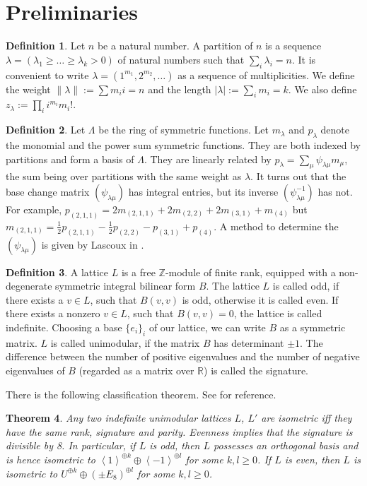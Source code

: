 \documentclass{amsart}
\newcommand{\coloneqq}{:=}
\newcommand{\IR}{\mathbb{R}}
\newcommand{\IZ}{\mathbb{Z}}
\theoremstyle{plain}
\newtheorem{theorem}{Theorem}[section]
\theoremstyle{definition}
\newtheorem{definition}[theorem]{Definition}
\theoremstyle{remark}
\begin{document}
\section{Preliminaries}
\begin{definition}
Let $n$ be a natural number. A partition of $n$ is a sequence $\lambda = (\lambda_1\geq\ldots\geq\lambda_k>0)$ of natural numbers such that $\sum_i \lambda_i =n$. It is convenient to write $\lambda = (1^{m_1},2^{m_2},\ldots)$ as a sequence of multiplicities. We define the weight $\|\lambda\| :=\sum m_i i =n$ and the length $|\lambda| := \sum_i m_i =k$. We also define $z_\lambda \coloneqq\prod_i i^{m_i} m_i!$. 
\end{definition}
\begin{definition} \label{SymFun}
Let $\Lambda$ be the ring of symmetric functions. Let $m_\lambda$ and $p_\lambda$ denote the monomial and the power sum symmetric functions. They are both indexed by partitions and form a basis of $\Lambda$. They are linearly related by $p_\lambda = \sum_{\mu} \psi_{\lambda\mu}m_\mu$, the sum being over partitions with the same weight as $\lambda$. It turns out that the base change matrix $(\psi_{\lambda\mu})$ has integral entries, but its inverse $(\psi_{\lambda\mu}^{-1})$ has not. For example, $p_{(2,1,1)} = 2m_{(2,1,1)} + 2m_{(2,2)}+2m_{(3,1)}+m_{(4)} $ but $ m_{(2,1,1)} = \frac{1}{2}p_{(2,1,1)} -\frac{1}{2}p_{(2,2)} -p_{(3,1)}+p_{(4)}$. A method to determine the $(\psi_{\lambda\mu})$ is given by Lascoux in \cite[Sect. 3.7]{Lascoux}.
\end{definition}
\begin{definition}
A lattice $L$ is a free $\IZ$-module of finite rank, equipped with a non-degenerate symmetric integral bilinear form $B$. The lattice $L$ is called odd, if there exists a $v\in L$, such that $B(v,v)$ is odd, otherwise it is called even. 
If there exists a nonzero $v \in L$, such that $B(v,v)= 0$, the lattice is called indefinite. 
Choosing a base $\{e_i\}_i$ of our lattice, we can write $B$ as a symmetric matrix. $L$ is called unimodular, if the matrix $B$ has determinant $\pm 1$. 
The difference between the number of positive eigenvalues and the number of negative eigenvalues of $B$ (regarded as a matrix over $\IR$) is called the signature.
\end{definition}
There is the following classification theorem. See \cite[Chap. II]{milnor1973symmetric} for reference.
\begin{theorem}
Any two indefinite unimodular lattices $L$, $L'$ are isometric iff they have the same rank, signature and parity. Evenness implies that the signature is divisible by 8. 
In particular, if $L$ is odd, then $L$ possesses an orthogonal basis and is hence isometric to $\left<1\right>^{\oplus k}\oplus\left<-1\right>^{\oplus l}$ for some $k,l\geq 0$. If $L$ is even, then $L$ is isometric to $U^{\oplus k}\oplus (\pm E_8)^{\oplus l}$ for some $k,l\geq 0$.
\end{theorem}
\end{document}
